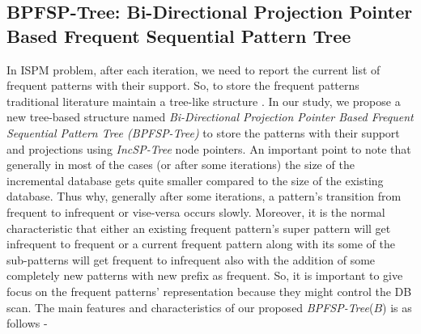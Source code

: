 \subsection{BPFSP-Tree: Bi-Directional Projection Pointer Based Frequent Sequential Pattern Tree}
In ISPM problem, after each iteration, we need to report the current list of frequent patterns with their support. So, to store the frequent patterns traditional literature maintain a tree-like structure \cite{chen2007incremental,liu2012incremental}. In our study, we propose a new tree-based structure named \textit{Bi-Directional Projection Pointer Based Frequent Sequential Pattern Tree (BPFSP-Tree)} to store the patterns with their support and projections using \textit{IncSP-Tree} node pointers. An important point to note that generally in most of the cases (or after some iterations) the size of the incremental database gets quite smaller compared to the size of the existing database. Thus why, generally after some iterations, a pattern's transition from frequent to infrequent or vise-versa occurs slowly. Moreover, it is the normal characteristic that either an existing frequent pattern's super pattern will get infrequent to frequent or a current frequent pattern along with its some of the sub-patterns will get frequent to infrequent also with the addition of some completely new patterns with new prefix as frequent. So, it is important to give focus on the frequent patterns' representation because they might control the DB scan. The main features and characteristics of our proposed \textit{BPFSP-Tree}($B$) is as follows -
